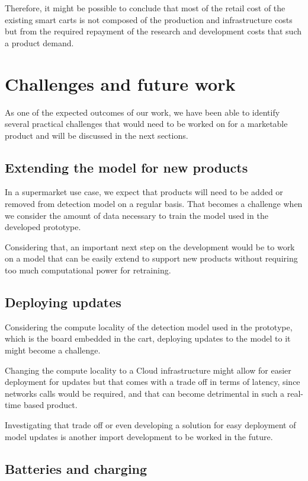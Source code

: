 \documentclass[openright]{normas-utf-tex} %
\begin{document}
Therefore, it might be possible to conclude that most of the retail cost of the
existing smart carts is not composed of the production and infrastructure costs
but from the required repayment of the research and development costs that such
a product demand.

\section{Challenges and future work}

As one of the expected outcomes of our work, we have been able to identify
several practical challenges that would need to be worked on for a marketable
product and will be discussed in the next sections.

\subsection{Extending the model for new products}
In a supermarket use case, we expect that products will need to be added or
removed from detection model on a regular basis. That becomes a challenge when
we consider the amount of data necessary to train the model used in the
developed prototype.

Considering that, an important next step on the development would be to work on
a model that can be easily extend to support new products without requiring too
much computational power for retraining.

\subsection{Deploying updates}

Considering the compute locality of the detection model used in the prototype,
which is the board embedded in the cart, deploying updates to the model to it
might become a challenge.

Changing the compute locality to  a Cloud infrastructure \cite{Aws2022} might
allow for easier deployment for updates but that comes with a trade off in
terms of latency, since networks calls would be required, and that can become
detrimental in such a real-time based product.

Investigating that trade off or even developing a solution for easy deployment
of model updates is another import development to be worked in the future. 

\subsection{Batteries and charging}
\end{document}
